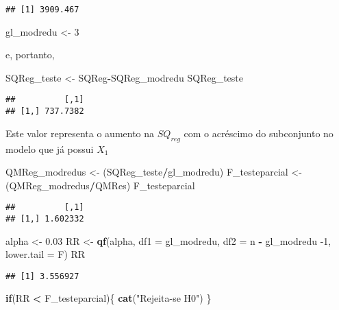 \documentclass[
]{article}
\newenvironment{Shaded}{\begin{snugshade}}{\end{snugshade}}
\newcommand{\ControlFlowTok}[1]{\textcolor[rgb]{0.13,0.29,0.53}{\textbf{#1}}}
\newcommand{\DataTypeTok}[1]{\textcolor[rgb]{0.13,0.29,0.53}{#1}}
\newcommand{\DecValTok}[1]{\textcolor[rgb]{0.00,0.00,0.81}{#1}}
\newcommand{\FloatTok}[1]{\textcolor[rgb]{0.00,0.00,0.81}{#1}}
\newcommand{\KeywordTok}[1]{\textcolor[rgb]{0.13,0.29,0.53}{\textbf{#1}}}
\newcommand{\NormalTok}[1]{#1}
\newcommand{\OperatorTok}[1]{\textcolor[rgb]{0.81,0.36,0.00}{\textbf{#1}}}
\newcommand{\StringTok}[1]{\textcolor[rgb]{0.31,0.60,0.02}{#1}}
\begin{document}
\begin{verbatim}
## [1] 3909.467
\end{verbatim}

\begin{Shaded}
\begin{Highlighting}[]
\NormalTok{gl_modredu <-}\StringTok{ }\DecValTok{3}
\end{Highlighting}
\end{Shaded}

e, portanto,

\begin{Shaded}
\begin{Highlighting}[]
\NormalTok{SQReg_teste <-}\StringTok{ }\NormalTok{SQReg}\OperatorTok{-}\NormalTok{SQReg_modredu}
\NormalTok{SQReg_teste}
\end{Highlighting}
\end{Shaded}

\begin{verbatim}
##          [,1]
## [1,] 737.7382
\end{verbatim}

Este valor representa o aumento na \(SQ_{reg}\) com o acréscimo do
subconjunto no modelo que já possui \(X_1\)

\begin{Shaded}
\begin{Highlighting}[]
\NormalTok{QMReg_modredus <-}\StringTok{ }\NormalTok{(SQReg_teste}\OperatorTok{/}\NormalTok{gl_modredu)}
\NormalTok{F_testeparcial <-}\StringTok{ }\NormalTok{(QMReg_modredus}\OperatorTok{/}\NormalTok{QMRes)}
\NormalTok{F_testeparcial}
\end{Highlighting}
\end{Shaded}

\begin{verbatim}
##          [,1]
## [1,] 1.602332
\end{verbatim}

\begin{Shaded}
\begin{Highlighting}[]
\NormalTok{alpha <-}\StringTok{ }\FloatTok{0.03}
\NormalTok{RR <-}\StringTok{ }\KeywordTok{qf}\NormalTok{(alpha, }\DataTypeTok{df1 =}\NormalTok{ gl_modredu, }\DataTypeTok{df2 =}\NormalTok{ n }\OperatorTok{-}\StringTok{ }\NormalTok{gl_modredu }\DecValTok{-1}\NormalTok{, }\DataTypeTok{lower.tail =}\NormalTok{ F)}
\NormalTok{RR}
\end{Highlighting}
\end{Shaded}

\begin{verbatim}
## [1] 3.556927
\end{verbatim}

\begin{Shaded}
\begin{Highlighting}[]
\ControlFlowTok{if}\NormalTok{(RR }\OperatorTok{<}\StringTok{ }\NormalTok{F_testeparcial)\{}
 \KeywordTok{cat}\NormalTok{(}\StringTok{"Rejeita-se H0"}\NormalTok{)}
\NormalTok{\}}
\end{Highlighting}
\end{Shaded}
\end{document}
